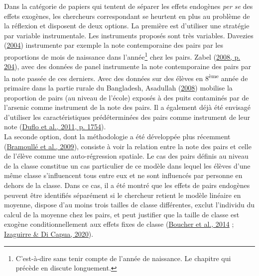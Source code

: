 \documentclass[
]{book}
\begin{document}
\quad Dans la catégorie de papiers qui tentent de séparer les effets endogènes \emph{per se} des effets exogènes, les chercheurs correspondant se heurtent en plus au problème de la réflexion et disposent de deux options. La première est d'utiliser une stratégie par variable instrumentale. Les instruments proposés sont très variables. Davezies (\protect\hyperlink{ref-DAV:04}{2004}) instrumente par exemple la note contemporaine des pairs par les proportions de mois de naissance dans l'année\footnote{C'est-à-dire sans tenir compte de l'année de naissance. Le chapitre qui précède en discute longuement.} chez les pairs. Zabel (\protect\hyperlink{ref-ZAB:08}{2008, p. 204}), avec des données de panel instrumente la note contemporaine des pairs par la note passée de ces derniers. Avec des données sur des élèves en 8\textsuperscript{ème} année de primaire dans la partie rurale du Bangladesh, Asadullah (\protect\hyperlink{ref-ASA:CHA:08}{2008}) mobilise la proportion de pairs (au niveau de l'école) exposés à des puits contaminés par de l'arsenic comme instrument de la note des pairs. Il a également déjà été envisagé d'utiliser les caractéristiques prédéterminées des pairs comme instrument de leur note (\protect\hyperlink{ref-DUF:eal:11}{Duflo et al., 2011, p. 1754}).\\
La seconde option, dont la méthodologie a été développée plus récemment (\protect\hyperlink{ref-BRA:eal:09}{Bramoullé et al., 2009}), consiste à voir la relation entre la note des pairs et celle de l'élève comme une auto-régression spatiale. Le cas des pairs définis au niveau de la classe constitue un cas particulier de ce modèle dans lequel les élèves d'une même classe s'influencent tous entre eux et ne sont influencés par personne en dehors de la classe. Dans ce cas, il a été montré que les effets de pairs endogènes peuvent être identifiés séparément si le chercheur retient le modèle linéaire en moyenne, dispose d'au moins trois tailles de classe différentes, exclut l'individu du calcul de la moyenne chez les pairs, et peut justifier que la taille de classe est exogène conditionnellement aux effets fixes de classe (\protect\hyperlink{ref-BOU:eal:14}{Boucher et al., 2014} ; \protect\hyperlink{ref-IZA:DIC:20}{Izaguirre \& Di Capua, 2020}).
\end{document}
